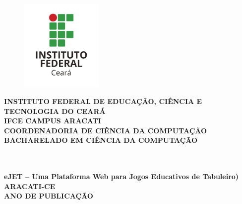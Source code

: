 \thispagestyle{empty}
\vfill
\begin{center}

\begin{figure}[t]
\centering
\includegraphics[width=4cm]{figuras/ifce-ceara.png}%
\end{figure}
\vspace{0.5 cm}
{\normalsize\bfseries INSTITUTO FEDERAL DE EDUCAÇÃO, CIÊNCIA E TECNOLOGIA DO CEARÁ} \\
{\normalsize\bfseries IFCE CAMPUS ARACATI} \\
{\normalsize\bfseries COORDENADORIA DE CIÊNCIA DA COMPUTAÇÃO}  \\ 
{\normalsize\bfseries BACHARELADO EM CIÊNCIA DA COMPUTAÇÃO}  \\ 

\vspace*{1in}
\begin{large} \bfseries \imprimirautor \end{large}\\[0.4in]

\vspace*{4cm}
\noindent \\
\large\bfseries{eJET – Uma Plataforma Web para Jogos
Educativos de Tabuleiro)} \\
\vfill
\normalsize\bfseries{ARACATI-CE\\ANO DE PUBLICAÇÃO}

\end{center}
\normalsize